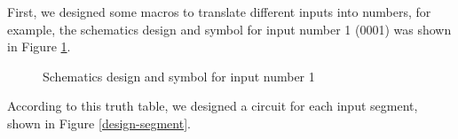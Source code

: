 \documentclass{article}
\begin{document}
First, we designed some macros to translate different inputs into numbers, for example, the schematics design and symbol for input number 1 (0001) was shown in Figure \ref{design-digit-1}.\\

\begin{figure}[!hbtp]
\centering
{}
\caption{Schematics design and symbol for input number 1}
\label{design-digit-1}
\end{figure}

According to this truth table, we designed a circuit for each input segment, shown in Figure \ref{design-segment}. \\
\end{document}
